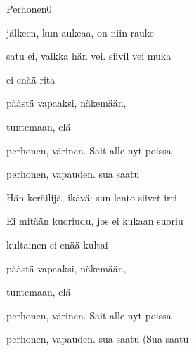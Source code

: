 \documentclass[12pt,a4paper]{article}
\begin{document}
\thispagestyle{empty}
\begin{mysong}{Perhonen}{0}

\begin{SBVerse}
 jälkeen, kun  aukeaa, on  niin
 rauke

 satu ei, vaikka  hän vei. 
siivil vei muka

  ei  enää
 rita

 päästä vapaaksi,  näkemään,

 tuntemaan,  elä
\end{SBVerse}

\begin{SBChorus}
 perhonen,  värinen.
Sait  alle  nyt poissa 

 perhonen,  vapauden.
 sua saatu 
\end{SBChorus}

\begin{SBVerse*}
\end{SBVerse*}

\begin{SBVerse}
Hän  keräilijä,  ikävä:  sun lento
 siivet irti 

Ei  mitään  kuoriudu, jos ei 
kukaan  suoriu

  kultainen ei  enää
 kultai

 päästä vapaaksi,  näkemään,

 tuntemaan,  elä
\end{SBVerse}

\begin{SBChorus}
 perhonen,  värinen.
Sait  alle  nyt poissa 

 perhonen,  vapauden.
 sua saatu  (Sua saatu


\end{SBChorus}
\end{mysong}
\end{document}
